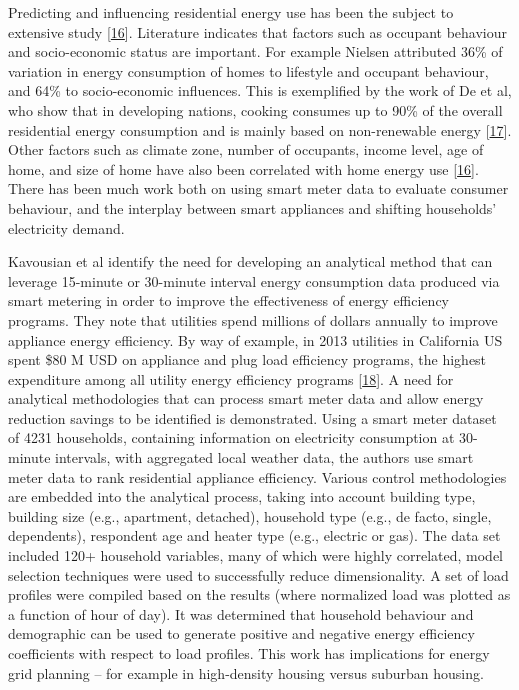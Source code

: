 \documentclass[11pt,]{article}
\begin{document}
Predicting and influencing residential energy use has been the subject
to extensive study
{[}\protect\hyperlink{ref-ilzelaicaneEvaluationHouseholdElectricity2015}{16}{]}.
Literature indicates that factors such as occupant behaviour and
socio-economic status are important. For example Nielsen attributed 36\%
of variation in energy consumption of homes to lifestyle and occupant
behaviour, and 64\% to socio-economic influences. This is exemplified by
the work of De et al, who show that in developing nations, cooking
consumes up to 90\% of the overall residential energy consumption and is
mainly based on non-renewable energy
{[}\protect\hyperlink{ref-d.m.murrayApplianceElectricalConsumption2018}{17}{]}.
Other factors such as climate zone, number of occupants, income level,
age of home, and size of home have also been correlated with home energy
use
{[}\protect\hyperlink{ref-ilzelaicaneEvaluationHouseholdElectricity2015}{16}{]}.
There has been much work both on using smart meter data to evaluate
consumer behaviour, and the interplay between smart appliances and
shifting households' electricity demand.

Kavousian et al identify the need for developing an analytical method
that can leverage 15-minute or 30-minute interval energy consumption
data produced via smart metering in order to improve the effectiveness
of energy efficiency programs. They note that utilities spend millions
of dollars annually to improve appliance energy efficiency. By way of
example, in 2013 utilities in California US spent \$80 M USD on
appliance and plug load efficiency programs, the highest expenditure
among all utility energy efficiency programs
{[}\protect\hyperlink{ref-amirkavousianRankingApplianceEnergy2015}{18}{]}.
A need for analytical methodologies that can process smart meter data
and allow energy reduction savings to be identified is demonstrated.
Using a smart meter dataset of 4231 households, containing information
on electricity consumption at 30-minute intervals, with aggregated local
weather data, the authors use smart meter data to rank residential
appliance efficiency. Various control methodologies are embedded into
the analytical process, taking into account building type, building size
(e.g., apartment, detached), household type (e.g., de facto, single,
dependents), respondent age and heater type (e.g., electric or gas). The
data set included 120+ household variables, many of which were highly
correlated, model selection techniques were used to successfully reduce
dimensionality. A set of load profiles were compiled based on the
results (where normalized load was plotted as a function of hour of
day). It was determined that household behaviour and demographic can be
used to generate positive and negative energy efficiency coefficients
with respect to load profiles. This work has implications for energy
grid planning -- for example in high-density housing versus suburban
housing.
\end{document}
